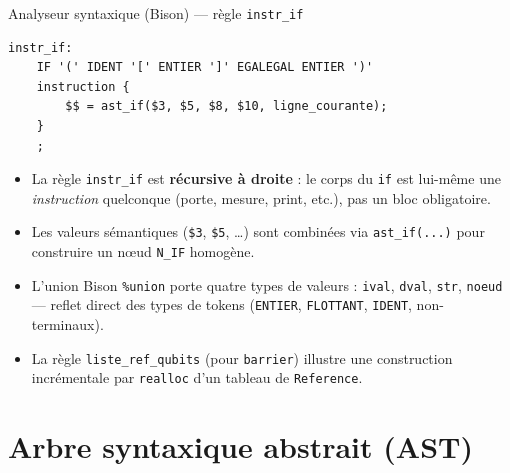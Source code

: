 \documentclass[10pt]{beamer}
\begin{document}
\begin{frame}[fragile]{Analyseur syntaxique (Bison) --- règle \texttt{instr\_if}}
\begin{lstlisting}[style=cstyle]
instr_if:
    IF '(' IDENT '[' ENTIER ']' EGALEGAL ENTIER ')'
    instruction {
        $$ = ast_if($3, $5, $8, $10, ligne_courante);
    }
    ;
\end{lstlisting}
  \begin{itemize}
    \item La règle \texttt{instr\_if} est \textbf{récursive à droite} : le corps du \texttt{if} est lui-même une \textit{instruction} quelconque (porte, mesure, print, etc.), pas un bloc obligatoire.
    \item Les valeurs sémantiques (\texttt{\$3}, \texttt{\$5}, \dots) sont combinées via \texttt{ast\_if(...)} pour construire un nœud \texttt{N\_IF} homogène.
    \item L'union Bison \texttt{\%union} porte quatre types de valeurs : \texttt{ival}, \texttt{dval}, \texttt{str}, \texttt{noeud} --- reflet direct des types de tokens (\texttt{ENTIER}, \texttt{FLOTTANT}, \texttt{IDENT}, non-terminaux).
    \item La règle \texttt{liste\_ref\_qubits} (pour \texttt{barrier}) illustre une construction incrémentale par \texttt{realloc} d'un tableau de \texttt{Reference}.
  \end{itemize}
\end{frame}

\section{Arbre syntaxique abstrait (AST)}
\end{document}
